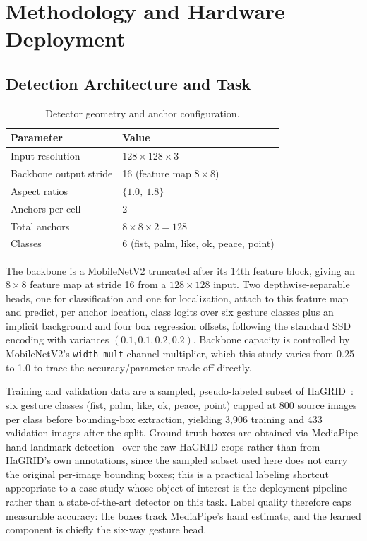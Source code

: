 \documentclass[conference]{IEEEtran}
\begin{document}
	\section{Methodology and Hardware Deployment}
	
	\subsection{Detection Architecture and Task}
	\label{sec:data}
	
	\begin{table}[h]
		\caption{Detector geometry and anchor configuration.}
		\label{tab:geometry}
		\centering
		\begin{tabular}{ll}
			\toprule
			Parameter & Value \\
			\midrule
			Input resolution & $128 \times 128 \times 3$ \\
			Backbone output stride & 16 (feature map $8\times8$) \\
			Aspect ratios & $\{1.0,\ 1.8\}$ \\
			Anchors per cell & 2 \\
			Total anchors & $8 \times 8 \times 2 = 128$ \\
			Classes & 6 (fist, palm, like, ok, peace, point) \\
			\bottomrule
		\end{tabular}
	\end{table}
	
	The backbone is a MobileNetV2 truncated after its 14th feature block, giving an $8\times8$
	feature map at stride 16 from a $128\times128$ input. Two depthwise-separable heads,
	one for classification and one for localization, attach to this feature map and predict, per anchor
	location, class logits over six gesture classes plus an implicit background and four box
	regression offsets, following the standard SSD encoding with variances
	$(0.1, 0.1, 0.2, 0.2)$. Backbone capacity is controlled by MobileNetV2's \texttt{width\_mult}
	channel multiplier, which this study varies from 0.25 to 1.0 to trace the accuracy/parameter
	trade-off directly.
	
	Training and validation data are a sampled, pseudo-labeled subset of
	HaGRID~\cite{kapitanov2024hagrid}: six gesture classes (fist, palm, like, ok, peace, point)
	capped at 800 source images per class before bounding-box extraction, yielding 3{,}906 training
	and 433 validation images after the split. Ground-truth boxes are obtained via MediaPipe hand
	landmark detection~\cite{zhang2020mediapipe} over the raw HaGRID crops rather than from HaGRID's own annotations, since
	the sampled subset used here does not carry the original per-image bounding boxes; this is a
	practical labeling shortcut appropriate to a case study whose object of interest is the
	deployment pipeline rather than a state-of-the-art detector on this task. Label quality therefore caps measurable accuracy: the boxes track MediaPipe's hand estimate, and the learned component is chiefly the six-way gesture head.
	
\end{document}
